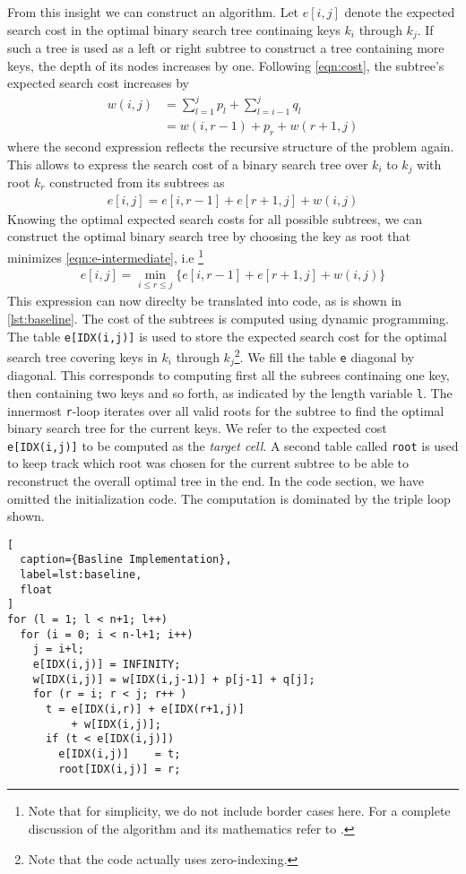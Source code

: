 From this insight we can construct an algorithm. Let $e[i,j]$ denote the
expected search cost in the optimal binary search tree continaing keys
$k_i$ through $k_j$. If such a tree is used as a left or right subtree to
construct a tree containing more keys, the depth of its nodes increases by
one. Following \autoref{eqn:cost}, the subtree's expected search cost
increases by
\begin{align}
  w(i,j) &= \sum_{l=1}^j p_l + \sum_{l=i-1}^j q_l \nonumber\\
         &= w(i,r-1) + p_r + w(r+1,j)
  \label{eqn:w}
\end{align}
where the second expression reflects the recursive structure of the problem
again. This allows to express the search cost of a binary search tree over
$k_i$ to $k_j$ with root $k_r$ constructed from its subtrees as
\begin{align}
  e[i,j] = e[i,r-1] + e[r+1,j] + w(i,j)
  \label{eqn:e-intermediate}
\end{align}
Knowing the optimal expected search costs for all possible subtrees, we can
construct the optimal binary search tree by choosing the key as root that
minimizes \autoref{eqn:e-intermediate}, i.e
\footnote{Note that for simplicity, we do not include border cases here.
For a complete discussion of the algorithm and its mathematics refer to
\cite{MITBook}.}
\begin{align}
  e[i,j] = \min_{i\leq r\leq j} \{e[i,r-1] + e[r+1,j] + w(i,j)\}
  \label{eqn:e}
\end{align}
This expression can now direclty be translated into code, as is shown in
\autoref{lst:baseline}. The cost of the subtrees is computed using dynamic
programming. The table \texttt{e[IDX(i,j)]} is used to store the
expected search cost for the optimal search tree covering keys in $k_i$
through $k_j$\footnote{Note that the code actually uses zero-indexing.}. We
fill the table \texttt{e} diagonal by diagonal. This corresponds to
computing first all the subrees continaing one key, then containing two
keys and so forth, as indicated by the length variable \texttt{l}. The
innermost \texttt{r}-loop iterates over all valid roots for the subtree to
find the optimal binary search tree for the current keys. We refer to the
expected cost \texttt{e[IDX(i,j)]} to be computed as the \emph{target
cell}. A second table called \texttt{root} is used to keep track which root
was chosen for the current subtree to be able to reconstruct the overall
optimal tree in the end. In the code section, we have omitted the
initialization code. The computation is dominated by the triple loop shown.
\begin{lstlisting}[
  caption={Basline Implementation},
  label=lst:baseline,
  float
]
for (l = 1; l < n+1; l++)
  for (i = 0; i < n-l+1; i++)
    j = i+l;
    e[IDX(i,j)] = INFINITY;
    w[IDX(i,j)] = w[IDX(i,j-1)] + p[j-1] + q[j];
    for (r = i; r < j; r++ )
      t = e[IDX(i,r)] + e[IDX(r+1,j)]
          + w[IDX(i,j)];
      if (t < e[IDX(i,j)])
        e[IDX(i,j)]    = t;
        root[IDX(i,j)] = r;
\end{lstlisting}

